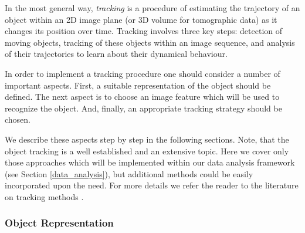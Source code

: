 In the most general way, \textit{tracking} is a procedure of estimating the trajectory of an object within an 2D image plane (or 3D volume for tomographic data) as it changes its position over time.  Tracking involves three key steps: detection of moving objects, tracking of these objects within an image sequence, and analysis of their trajectories to learn about their dynamical behaviour.

In order to implement a tracking procedure one should consider a number of important aspects.
First, a suitable representation of the object should be defined. The next aspect is to choose an image feature which will be used to recognize the object. And, finally, an appropriate tracking strategy should be chosen. 

We describe these aspects step by step in the following sections. Note, that the object tracking is a well established and an extensive topic. Here we cover only those approaches which will be implemented within our data analysis framework (see Section \ref{data_analysis}), but additional methods could be  easily incorporated upon the need. For more details we refer the reader to the literature on tracking methods \cite{Yilmaz06, Trucco06}.  


\subsubsection{Object Representation}
\label{tracking_object_representation}

